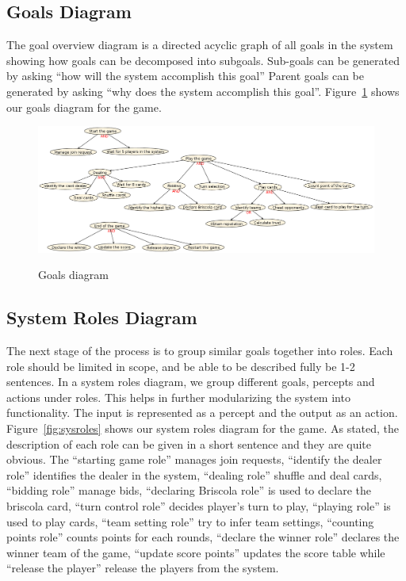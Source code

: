 \documentclass[a4paper]{article}
\begin{document}
\subsection{Goals Diagram}

The goal overview diagram is a directed acyclic graph of all goals in the system showing how goals can be decomposed into subgoals. Sub-goals can be generated by asking ``how will the system accomplish this goal'' Parent goals can be generated by asking ``why does the system accomplish this goal''. Figure~\ref{fig:goals} shows our goals diagram for the game.

\begin{figure}[htp]
  \includegraphics[keepaspectratio,scale=0.4]{pdt/images/system_specification/goal_overview.png}
  \label{fig:goals}
  \caption{Goals diagram}
\end{figure}
  
\subsection{System Roles Diagram}

The next stage of the process is to group similar goals together into roles. Each role should be limited in scope, and be able to be described fully be 1-2 sentences. In a system roles diagram, we group different goals, percepts and actions under roles. This helps in further modularizing the system into functionality. The input is represented as a percept and the output as an action. Figure~\ref{fig:sysroles} shows our system roles diagram for the game. As stated, the description of each role can be given in a short sentence and they are quite obvious. The ``starting game role'' manages join requests, ``identify the dealer role'' identifies the dealer in the system, ``dealing role'' shuffle and deal cards, ``bidding role'' manage bids, ``declaring Briscola role'' is used to declare the briscola card, ``turn control role'' decides player's turn to play, ``playing role'' is used to play cards, ``team setting role'' try to infer team settings, ``counting points role'' counts points for each rounds, ``declare the winner role'' declares the winner team of the game, ``update score points'' updates the score table while ``release the player'' release the players from the system. 
\end{document}
